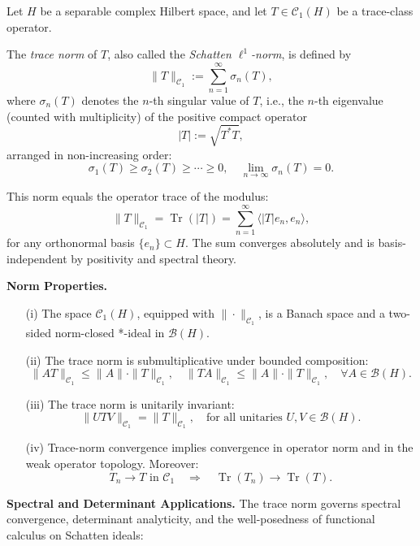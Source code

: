 \begin{definition}\label{def:trace_norm}
Let \( H \) be a separable complex Hilbert space, and let \( T \in \mathcal{C}_1(H) \) be a trace-class operator.

The \emph{trace norm} of \( T \), also called the \emph{Schatten \( \ell^1 \)-norm}, is defined by
\[
\| T \|_{\mathcal{C}_1} := \sum_{n=1}^\infty \sigma_n(T),
\]
where \( \sigma_n(T) \) denotes the \( n \)-th singular value of \( T \), i.e., the \( n \)-th eigenvalue (counted with multiplicity) of the positive compact operator
\[
|T| := \sqrt{T^* T},
\]
arranged in non-increasing order:
\[
\sigma_1(T) \ge \sigma_2(T) \ge \cdots \ge 0, \quad \lim_{n \to \infty} \sigma_n(T) = 0.
\]

This norm equals the operator trace of the modulus:
\[
\| T \|_{\mathcal{C}_1} = \operatorname{Tr}(|T|) = \sum_{n=1}^\infty \langle |T| e_n, e_n \rangle,
\]
for any orthonormal basis \( \{ e_n \} \subset H \). The sum converges absolutely and is basis-independent by positivity and spectral theory.

\medskip
\noindent\textbf{Norm Properties.}
\begin{enumerate}
    \item[\textup{(i)}] The space \( \mathcal{C}_1(H) \), equipped with \( \| \cdot \|_{\mathcal{C}_1} \), is a Banach space and a two-sided norm-closed *-ideal in \( \mathcal{B}(H) \).
    
    \item[\textup{(ii)}] The trace norm is submultiplicative under bounded composition:
    \[
    \| AT \|_{\mathcal{C}_1} \le \|A\| \cdot \|T\|_{\mathcal{C}_1}, \quad
    \| TA \|_{\mathcal{C}_1} \le \|A\| \cdot \|T\|_{\mathcal{C}_1}, \quad \forall A \in \mathcal{B}(H).
    \]

    \item[\textup{(iii)}] The trace norm is unitarily invariant:
    \[
    \| U T V \|_{\mathcal{C}_1} = \|T\|_{\mathcal{C}_1}, \quad \text{for all unitaries } U, V \in \mathcal{B}(H).
    \]

    \item[\textup{(iv)}] Trace-norm convergence implies convergence in operator norm and in the weak operator topology. Moreover:
    \[
    T_n \to T \text{ in } \mathcal{C}_1 \quad \Rightarrow \quad \operatorname{Tr}(T_n) \to \operatorname{Tr}(T).
    \]
\end{enumerate}

\medskip
\noindent\textbf{Spectral and Determinant Applications.}
The trace norm governs spectral convergence, determinant analyticity, and the well-posedness of functional calculus on Schatten ideals:


\end{definition}
